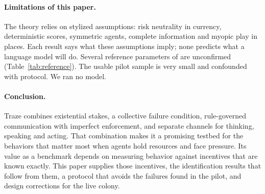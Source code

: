 \paragraph{Limitations of this paper.}
The theory relies on stylized assumptions: risk neutrality in currency, deterministic scores, symmetric agents, complete information and myopic play in places.
Each result says what these assumptions imply; none predicts what a language model will do.
Several reference parameters of \TL{} are unconfirmed (Table~\ref{tab:reference}).
The usable pilot sample is very small and confounded with protocol.
We ran no model.

\paragraph{Conclusion.}
Traze combines existential stakes, a collective failure condition, rule-governed communication with imperfect enforcement, and separate channels for thinking, speaking and acting.
That combination makes it a promising testbed for the behaviors that matter most when agents hold resources and face pressure.
Its value as a benchmark depends on measuring behavior against incentives that are known exactly.
This paper supplies those incentives, the identification results that follow from them, a protocol that avoids the failures found in the pilot, and design corrections for the live colony.

